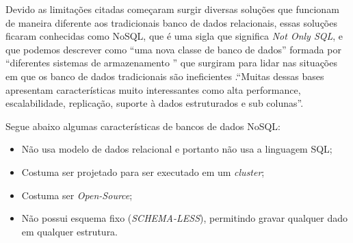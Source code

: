 Devido as limitações citadas começaram surgir diversas soluções que funcionam de maneira diferente aos tradicionais banco de dados relacionais, essas soluções ficaram conhecidas como NoSQL, que é uma sigla que significa \textit{Not Only SQL}, e que podemos descrever como ``uma nova classe de banco de dados'' \cite{AnaliseNosql} formada por ``diferentes sistemas de armazenamento ''\cite{NosqlIm} que surgiram para lidar nas situações em que os banco de dados tradicionais são ineficientes .``Muitas dessas bases apresentam características muito interessantes como alta performance, escalabilidade, replicação, suporte à dados estruturados e sub colunas''\cite{NosqlIm}. 

Segue abaixo algumas características de bancos de dados NoSQL\cite{compBds}:
\begin{itemize}
\item Não usa modelo de dados relacional e portanto não usa a linguagem SQL;
\item Costuma ser projetado para ser executado em um \textit{cluster};
\item Costuma ser \textit{Open-Source};
\item Não possui esquema fixo (\textit{SCHEMA-LESS}), permitindo gravar qualquer dado em qualquer estrutura.
\end{itemize}

